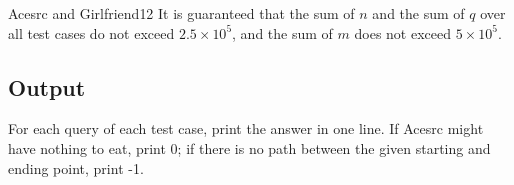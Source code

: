 \begin{Problem}{Acesrc and Girlfriend}{12}
It is guaranteed that the sum of $n$ and the sum of $q$ over all test cases do not exceed $2.5 \times 10^5$, and the sum of $m$ does not exceed $5 \times 10^5$.

\subsection*{Output}

For each query of each test case, print the answer in one line. If Acesrc might have nothing to eat, print 0; if there is no path between the given starting and ending point, print -1.


\end{Problem}
